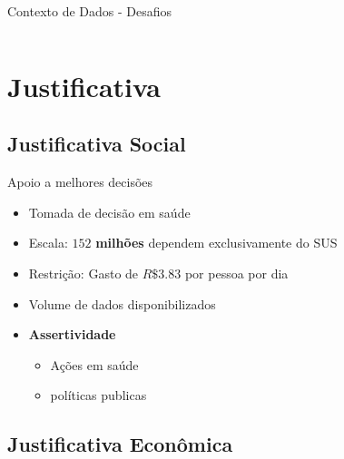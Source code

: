 \documentclass[10pt,brazil]{beamer}
\theoremstyle{definition}
\begin{document}
\begin{frame}{Contexto de Dados - Desafios}
\begin{columns}
\begin{column}{0.5\textwidth}
      \end{column}
  \end{columns}
\end{frame}


\section{Justificativa}

\subsection{Justificativa Social}

\begin{frame}{Apoio a melhores decisões}

      \begin{itemize}
            \item Tomada de decisão em saúde
            \item Escala: $152$ \textbf{milhões} dependem exclusivamente do SUS
            \item Restrição: Gasto de $R\$3.83$ por pessoa por dia
            \item Volume de dados disponibilizados 
            \item \textbf{Assertividade}
      \begin{itemize}
          \item Ações em saúde
          \item políticas publicas
      \end{itemize}
      \end{itemize}
 
\end{frame}

\subsection{Justificativa Econômica}
\end{document}
